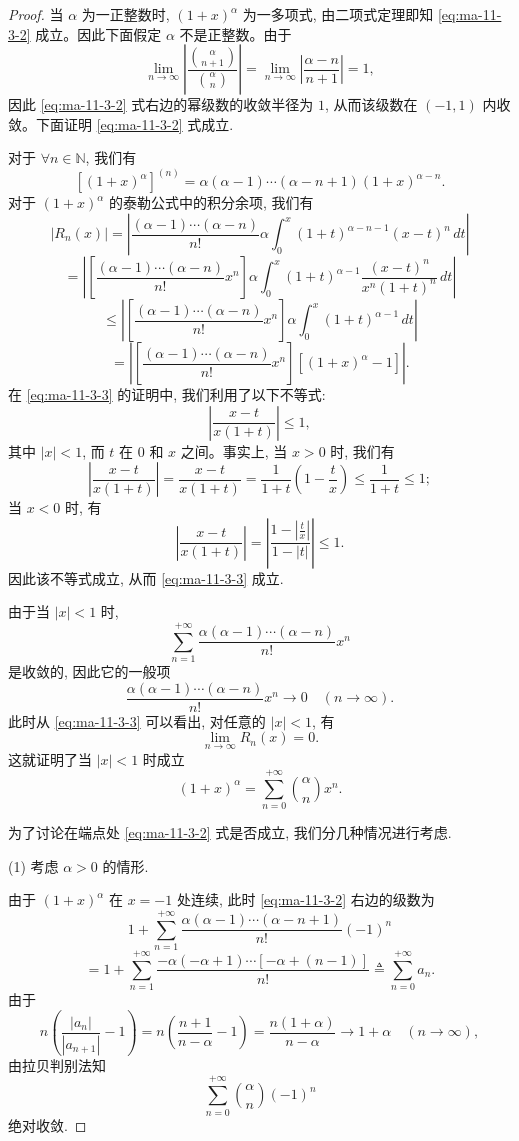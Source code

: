 \begin{proof}
当 $\alpha$ 为一正整数时, $(1+x)^\alpha$ 为一多项式, 由二项式定理即知 \eqref{eq:ma-11-3-2} 成立。因此下面假定 $\alpha$ 不是正整数。由于
\[
  \lim_{n\to\infty}
  \left|
    \frac{\binom{\alpha}{n+1}}{\binom{\alpha}{n}}
  \right|
  =
  \lim_{n\to\infty}\left|\frac{\alpha-n}{n+1}\right|
  =1,
\]
因此 \eqref{eq:ma-11-3-2} 式右边的幂级数的收敛半径为 $1$, 从而该级数在 $(-1,1)$ 内收敛。下面证明 \eqref{eq:ma-11-3-2} 式成立.

对于 $\forall n\in\mathbb N$, 我们有
\[
  [(1+x)^\alpha]^{(n)}
  =
  \alpha(\alpha-1)\cdots(\alpha-n+1)(1+x)^{\alpha-n}.
\]
对于 $(1+x)^\alpha$ 的泰勒公式中的积分余项, 我们有
\[
  |R_n(x)|
  =
  \left|
    \frac{(\alpha-1)\cdots(\alpha-n)}{n!}\alpha
    \int_0^x(1+t)^{\alpha-n-1}(x-t)^n\,dt
  \right|
\]
\[
  =
  \left|
    \left[\frac{(\alpha-1)\cdots(\alpha-n)}{n!}x^n\right]
    \alpha\int_0^x(1+t)^{\alpha-1}
    \frac{(x-t)^n}{x^n(1+t)^n}\,dt
  \right|
\]
\[
  \leqslant
  \left|
    \left[\frac{(\alpha-1)\cdots(\alpha-n)}{n!}x^n\right]
    \alpha\int_0^x(1+t)^{\alpha-1}\,dt
  \right|
\]
\begin{equation}
  =
  \left|
    \left[\frac{(\alpha-1)\cdots(\alpha-n)}{n!}x^n\right]
    [(1+x)^\alpha-1]
  \right|.
  \label{eq:ma-11-3-3}
\end{equation}
在 \eqref{eq:ma-11-3-3} 的证明中, 我们利用了以下不等式:
\[
  \left|\frac{x-t}{x(1+t)}\right|\leqslant1,
\]
其中 $|x|<1$, 而 $t$ 在 $0$ 和 $x$ 之间。事实上, 当 $x>0$ 时, 我们有
\[
  \left|\frac{x-t}{x(1+t)}\right|
  =
  \frac{x-t}{x(1+t)}
  =
  \frac1{1+t}\left(1-\frac{t}{x}\right)
  \leqslant
  \frac1{1+t}
  \leqslant1;
\]
当 $x<0$ 时, 有
\[
  \left|\frac{x-t}{x(1+t)}\right|
  =
  \left|\frac{1-\left|\frac{t}{x}\right|}{1-|t|}\right|
  \leqslant1.
\]
因此该不等式成立, 从而 \eqref{eq:ma-11-3-3} 成立.

由于当 $|x|<1$ 时,
\[
  \sum_{n=1}^{+\infty}
  \frac{\alpha(\alpha-1)\cdots(\alpha-n)}{n!}x^n
\]
是收敛的, 因此它的一般项
\[
  \frac{\alpha(\alpha-1)\cdots(\alpha-n)}{n!}x^n
  \to0\quad(n\to\infty).
\]
此时从 \eqref{eq:ma-11-3-3} 可以看出, 对任意的 $|x|<1$, 有
\[
  \lim_{n\to\infty}R_n(x)=0.
\]
这就证明了当 $|x|<1$ 时成立
\[
  (1+x)^\alpha=\sum_{n=0}^{+\infty}\binom{\alpha}{n}x^n.
\]

为了讨论在端点处 \eqref{eq:ma-11-3-2} 式是否成立, 我们分几种情况进行考虑.

(1) 考虑 $\alpha>0$ 的情形.

由于 $(1+x)^\alpha$ 在 $x=-1$ 处连续, 此时 \eqref{eq:ma-11-3-2} 右边的级数为
\[
  1+\sum_{n=1}^{+\infty}
  \frac{\alpha(\alpha-1)\cdots(\alpha-n+1)}{n!}(-1)^n
\]
\[
  =
  1+\sum_{n=1}^{+\infty}
  \frac{-\alpha(-\alpha+1)\cdots[-\alpha+(n-1)]}{n!}
  \triangleq
  \sum_{n=0}^{+\infty}a_n.
\]
由于
\[
  n\left(\frac{|a_n|}{|a_{n+1}|}-1\right)
  =
  n\left(\frac{n+1}{n-\alpha}-1\right)
  =
  \frac{n(1+\alpha)}{n-\alpha}
  \to1+\alpha\quad(n\to\infty),
\]
由拉贝判别法知
\[
  \sum_{n=0}^{+\infty}\binom{\alpha}{n}(-1)^n
\]
绝对收敛.


\end{proof}
